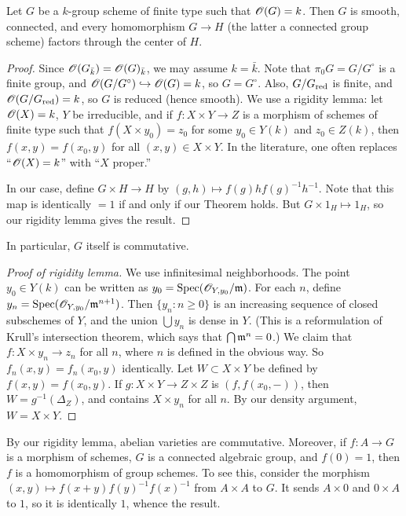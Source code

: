 \begin{theo}
Let $G$ be a $k$-group scheme of finite type such that $\mathscr{O}(G)=k$. Then $G$ 
is smooth, connected, and every homomorphism $G\to H$ (the latter a connected 
group scheme) factors through the center of $H$. 
\end{theo}
\begin{proof}
Since $\mathscr{O}(G_{\bar k}) = \mathscr{O}(G)_{\bar k}$, we may assume $k=\bar k$. Note that 
$\pi_0 G = G/G^\circ$ is a finite group, and 
$\mathscr{O}(G/G^\circ)\hookrightarrow \mathscr{O}(G)=k$, so $G=G^\circ$. Also, 
$G/G_{\mathrm{red}}$ is finite, and $\mathscr{O}(G/G_{\mathrm{red}})=k$, so $G$ is reduced (hence 
smooth). We use a rigidity lemma: let $\mathscr{O}(X)=k$, $Y$ be irreducible, and 
if $f:X\times Y\to Z$ is a morphism of schemes 
of finite type such that $f(X\times y_0)=z_0$ for some $y_0\in Y(k)$ and 
$z_0\in Z(k)$, then $f(x,y) = f(x_0,y)$ for all $(x,y)\in X\times Y$. In the 
literature, one often replaces ``$\mathscr{O}(X)=k$'' with ``$X$ proper.'' 

In our case, define $G\times H \to H$ by $(g,h)\mapsto f(g) h f(g)^{-1} h^{-1}$. 
Note that this map is identically $=1$ if and only if our Theorem holds. But 
$G\times 1_H\mapsto 1_H$, so our rigidity lemma gives the result. 
\end{proof}
In particular, $G$ itself is commutative. 

\begin{proof}[Proof of rigidity lemma]
We use infinitesimal neighborhoods. The point $y_0\in Y(k)$ can be written 
as $y_0=\operatorname{Spec}(\mathscr{O}_{Y,y_0}/\mathfrak{m})$. For each $n$, define 
$y_n = \operatorname{Spec}(\mathscr{O}_{Y,y_0}/\mathfrak{m}^{n+1})$. Then $\{y_n:n\geqslant 0\}$ is 
an increasing sequence of closed subschemes of $Y$, and the union 
$\bigcup y_n$ is dense in $Y$. (This is a reformulation of Krull's 
intersection theorem, which says that $\bigcap \mathfrak{m}^n=0$.) We claim that 
$f:X\times y_n \to z_n$ for all $n$, where $n$ is defined in the obvious 
way.  So $f_n(x,y) = f_n(x_0,y)$ identically. Let 
$W\subset X\times Y$ be defined by $f(x,y) = f(x_0,y)$. If 
$g:X\times Y\to Z\times Z$ is $(f,f(x_0,-))$, then 
$W=g^{-1}(\Delta_Z)$, and contains $X\times y_n$ for all 
$n$. By our density argument, $W=X\times Y$. 
\end{proof}

By our rigidity lemma, abelian varieties are commutative. Moreover, if 
$f:A\to G$ is a morphism of schemes, $G$ is a connected algebraic group, 
and $f(0)=1$, then $f$ is a homomorphism of group schemes. To see this, 
consider the morphism $(x,y)\mapsto f(x+y) f(y)^{-1} f(x)^{-1}$ from 
$A\times A$ to $G$. It sends $A\times 0$ and $0\times A$ to $1$, so it is 
identically $1$, whence the result. 




